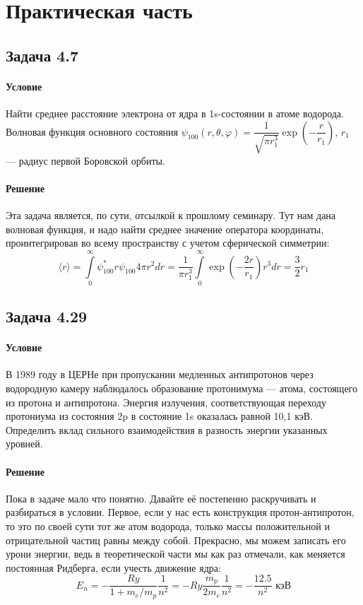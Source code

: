 \documentclass[12pt]{article}
\begin{document}
\section{Практическая часть}
\subsection{Задача 4.7}
\label{task_4.7}
\paragraph{Условие} Найти среднее расстояние электрона от ядра в 1s-состоянии в атоме водорода. Волновая функция основного состояния $\psi_{100}(r, \theta, \varphi) = \dfrac{1}{\sqrt{\pi r_1^3}}\exp{\left(-\dfrac{r}{r_1} \right)}$, $r_1$ --- радиус первой Боровской орбиты.
\paragraph{Решение}
Эта задача является, по сути, отсылкой к прошлому семинару. Тут нам дана волновая функция, и надо найти среднее значение оператора координаты, проинтегрировав во всему пространству с учетом сферической симметрии:
\begin{equation}
    \langle r\rangle = \int\limits_0^{\infty} \psi^*_{100} r \psi_{100} 4\pi r^2 dr =\dfrac{1}{\pi r_1^3}\int\limits_0^{\infty} \exp{\left(- \dfrac{2r}{r_1} \right)} r^3 dr = \dfrac{3}{2}r_1
\end{equation}

\subsection{Задача 4.29}
\label{task_4.29}
\paragraph{Условие} В 1989 году в ЦЕРНе при пропускании медленных антипротонов через водородную камеру наблюдалось образование протонимума --- атома, состоящего из протона и антипротона. Энергия излучения, соответствующая переходу протониума из состояния 2p в состояние 1s оказалась равной 10,1 кэВ. Определить вклад сильного взаимодействия в разность энергии указанных уровней.
\paragraph{Решение}
Пока в задаче мало что понятно. Давайте её постепенно раскручивать и разбираться в условии. Первое, если у нас есть конструкция протон-антипротон, то это по своей сути тот же атом водорода, только массы положительной и отрицательной частиц равны между собой. Прекрасно, мы можем записать его урони энергии, ведь в теоретической части мы как раз отмечали, как меняется постоянная Ридберга, если учесть движение ядра:
\begin{equation*}
    E_n = - \dfrac{Ry}{1+m_e/m_p}\dfrac{1}{n^2} = -Ry\dfrac{m_p}{2m_e} \dfrac{1}{n^2} = -\dfrac{12.5}{n^2} \text{ кэВ}
\end{equation*}
\end{document}
